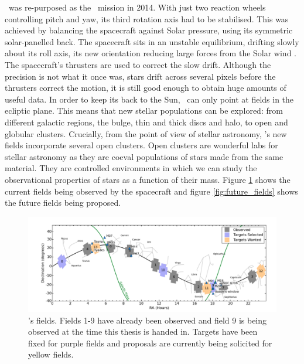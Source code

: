 \kepler\ was re-purposed as the \ktwo\ mission in 2014.
With just two reaction wheels controlling pitch and yaw, its third rotation
axis had to be stabilised.
This was achieved by balancing the spacecraft against Solar pressure, using
its symmetric solar-panelled back.
The spacecraft sits in an unstable equilibrium, drifting slowly about its roll
axis, its new orientation reducing large forces from the Solar wind
\citep{Howell2014}.
The spacecraft's thrusters are used to correct the slow drift.
Although the precision is not what it once was, stars drift across several
pixels before the thrusters correct the motion, it is still good enough to
obtain huge amounts of useful data.
In order to keep its back to the Sun, \kepler\ can only point at fields in the
ecliptic plane.
This means that new stellar populations can be explored: from different
galactic regions, the bulge, thin and thick discs and halo, to open and
globular clusters.
Crucially, from the point of view of stellar astronomy, \kepler's new fields
incorporate several open clusters.
Open clusters are wonderful labs for stellar astronomy as they are coeval
populations of stars made from the same material.
They are controlled environments in which we can study the observational
properties of stars as a function of their mass.
Figure \ref{fig:current_fields} shows the current fields being observed by the
spacecraft and figure \ref{fig:future_fields} shows the future fields being
proposed.

\begin{figure}[p]
\begin{center}
\includegraphics[width=6in, clip=true]{figures/Current_K2_fields.pdf}
\caption[Current \ktwo\ fields]{\ktwo's fields. Fields 1-9 have already been
observed and field 9 is being observed at the time this thesis is handed in.
Targets have been fixed for purple fields and proposals are currently being
solicited for yellow fields.}
\label{fig:current_fields}
\end{center}
\end{figure}

